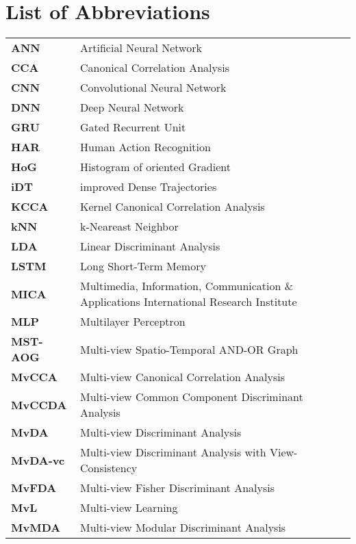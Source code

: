 
\cleardoublepage
{}
\chapter*{List of Abbreviations}

\begin{longtable}{p{} p{}}
    \textbf{ANN} & Artificial Neural Network\\
    \textbf{CCA} & Canonical Correlation Analysis\\
    \textbf{CNN} & Convolutional Neural Network\\
    \textbf{DNN} & Deep Neural Network\\
    \textbf{GRU} & Gated Recurrent Unit\\
    \textbf{HAR} & Human Action Recognition\\
    \textbf{HoG} & Histogram of oriented Gradient\\
    \textbf{iDT} & improved Dense Trajectories\\
    \textbf{KCCA} & Kernel Canonical Correlation Analysis\\
    \textbf{kNN} & k-Neareast Neighbor\\
    \textbf{LDA} & Linear Discriminant Analysis\\
    \textbf{LSTM} & Long Short-Term Memory\\
    \textbf{MICA} & Multimedia, Information, Communication \& Applications International Research Institute\\
    \textbf{MLP} & Multilayer Perceptron\\
    \textbf{MST-AOG} & Multi-view Spatio-Temporal AND-OR Graph\\
    \textbf{MvCCA} & Multi-view Canonical Correlation Analysis\\
    \textbf{MvCCDA} & Multi-view Common Component Discriminant Analysis\\
    \textbf{MvDA} & Multi-view Discriminant Analysis\\
    \textbf{MvDA-vc} & Multi-view Discriminant Analysis with View-Consistency\\
    \textbf{MvFDA} & Multi-view Fisher Discriminant Analysis\\
    \textbf{MvL} & Multi-view Learning\\
    \textbf{MvMDA} & Multi-view Modular Discriminant Analysis\\

\end{longtable}
